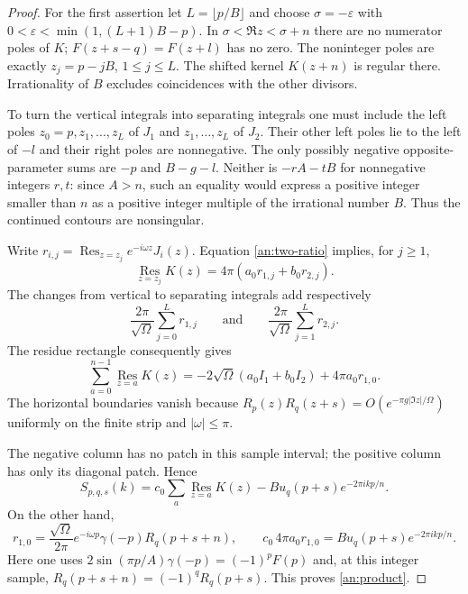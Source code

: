 \documentclass[11pt]{article}
\numberwithin{equation}{section}
\theoremstyle{definition}
\theoremstyle{remark}
\begin{document}
\begin{proof}
For the first assertion let $L=\lfloor p/B\rfloor$ and choose
$\sigma=-\varepsilon$ with
$0<\varepsilon<\min(1,(L+1)B-p)$.
In $\sigma<\Re z<\sigma+n$ there are no numerator poles of $K$;
$F(z+s-q)=F(z+l)$ has no zero.  The noninteger poles are exactly
$z_j=p-jB$, $1\le j\le L$.  The shifted kernel $K(z+n)$ is
regular there.  Irrationality of $B$ excludes coincidences with
the other divisors.

To turn the vertical integrals into separating integrals one must
include the left poles $z_0=p,z_1,\ldots,z_L$ of $J_1$ and
$z_1,\ldots,z_L$ of $J_2$.  Their other left poles lie to the left
of $-l$ and their right poles are nonnegative.  The only possibly
negative opposite-parameter sums are $-p$ and $B-g-l$.
Neither is $-rA-tB$ for nonnegative integers $r,t$: since $A>n$,
such an equality would express a positive integer smaller than $n$
as a positive integer multiple of the irrational number $B$.
Thus the continued contours are nonsingular.

Write $r_{i,j}=\operatorname*{Res}_{z=z_j}e^{-i\omega z}J_i(z)$.
Equation \eqref{an:two-ratio} implies, for $j\ge1$,
\[
 \operatorname*{Res}_{z=z_j}K(z)=4\pi(a_0r_{1,j}+b_0r_{2,j}).
\]
The changes from vertical to separating integrals add respectively
\[
 \frac{2\pi}{\sqrt\Omega}\sum_{j=0}^Lr_{1,j}
 \qquad\text{and}\qquad
 \frac{2\pi}{\sqrt\Omega}\sum_{j=1}^Lr_{2,j}.
\]
The residue rectangle consequently gives
\begin{equation}
 \sum_{a=0}^{n-1}\operatorname*{Res}_{z=a}K(z)
 =-2\sqrt\Omega(a_0I_1+b_0I_2)+4\pi a_0r_{1,0}.
 \label{an:rectangle}
\end{equation}
The horizontal boundaries vanish because
$R_p(z)R_q(z+s)=O(e^{-\pi g|\Im z|/\Omega})$ uniformly on the
finite strip and $|\omega|\le\pi$.

The negative column has no patch in this sample interval; the
positive column has only its diagonal patch.  Hence
\[
 S_{p,q,s}(k)=c_0\sum_a\operatorname*{Res}_{z=a}K(z)
                    -B u_q(p+s)e^{-2\pi ikp/n}.
\]
On the other hand,
\[
 r_{1,0}=\frac{\sqrt\Omega}{2\pi}e^{-i\omega p}
                 \gamma(-p)R_q(p+s+n),\qquad
 c_0\,4\pi a_0r_{1,0}=B u_q(p+s)e^{-2\pi ikp/n}.
\]
Here one uses $2\sin(\pi p/A)\gamma(-p)=(-1)^pF(p)$ and,
at this integer sample, $R_q(p+s+n)=(-1)^qR_q(p+s)$.
This proves \eqref{an:product}.


\end{proof}
\end{document}
